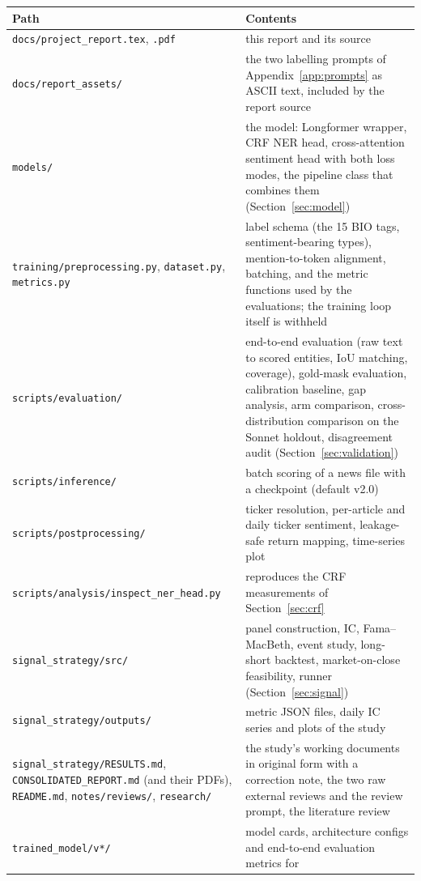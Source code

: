 \documentclass[11pt,letterpaper]{article}
\newcommand{\code}[1]{\texttt{#1}}
\begin{document}
\begin{table}[H]
\centering\footnotesize
\begin{tabularx}{\linewidth}{@{}P{5.9cm}Y@{}}
\toprule
\textbf{Path} & \textbf{Contents} \\
\midrule
\code{docs/project\_report.tex}, \code{.pdf} & this report and its source \\
\code{docs/report\_assets/} & the two labelling prompts of Appendix~\ref{app:prompts} as ASCII
  text, included by the report source \\
\code{models/} & the model: Longformer wrapper, CRF NER head, cross-attention sentiment head with
  both loss modes, the pipeline class that combines them (Section~\ref{sec:model}) \\
\code{training/preprocessing.py}, \code{dataset.py}, \code{metrics.py} & label schema (the 15 BIO
  tags, sentiment-bearing types), mention-to-token alignment, batching, and the metric functions
  used by the evaluations; the training loop itself is withheld \\
\code{scripts/evaluation/} & end-to-end evaluation (raw text to scored entities, IoU matching,
  coverage), gold-mask evaluation, calibration baseline, gap analysis, arm comparison,
  cross-distribution comparison on the Sonnet holdout, disagreement audit
  (Section~\ref{sec:validation}) \\
\code{scripts/inference/} & batch scoring of a news file with a checkpoint (default v2.0) \\
\code{scripts/postprocessing/} & ticker resolution, per-article and daily ticker sentiment,
  leakage-safe return mapping, time-series plot \\
\code{scripts/analysis/inspect\_ner\_head.py} & reproduces the CRF measurements of
  Section~\ref{sec:crf} \\
\code{signal\_strategy/src/} & panel construction, IC, Fama--MacBeth, event study, long-short
  backtest, market-on-close feasibility, runner (Section~\ref{sec:signal}) \\
\code{signal\_strategy/outputs/} & metric JSON files, daily IC series and plots of the study \\
\code{signal\_strategy/RESULTS.md}, \code{CONSOLIDATED\_REPORT.md} (and their PDFs),
  \code{README.md}, \code{notes/reviews/}, \code{research/} & the study's working documents in
  original form with a correction note, the two raw external reviews and the review prompt, the
  literature review \\
\code{trained\_model/v*/} & model cards, architecture configs and end-to-end evaluation metrics for

\end{tabularx}
\end{table}
\end{document}
